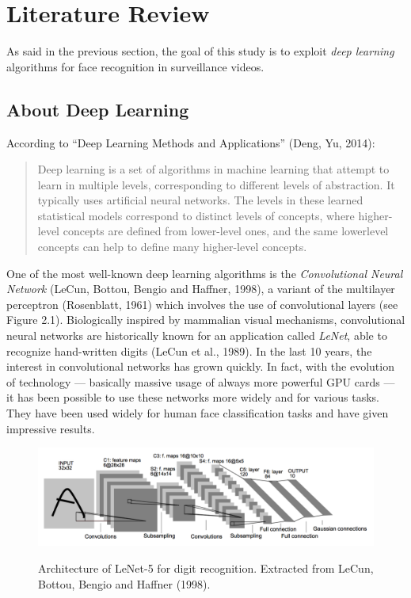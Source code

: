 \setlength{\footskip}{8mm}

\chapter{Literature Review} 
\protect\label{ch:literature-review}

As said in the previous section, the goal of this study is to exploit \textit{deep learning} algorithms for face recognition in surveillance videos.

\section{About Deep Learning}
\protect\label{Main-keywords-of-the-topic}
According to \enquote{Deep Learning Methods and Applications} (Deng, Yu, 2014):

\blockquote{Deep learning is a set of algorithms in machine
learning that attempt to learn in multiple levels, corresponding
to different levels of abstraction. It typically uses artificial
neural networks. The levels in these learned statistical models
correspond to distinct levels of concepts, where higher-level concepts
are defined from lower-level ones, and the same lowerlevel
concepts can help to define many higher-level concepts.}

One of the most well-known deep learning algorithms is the \textit{Convolutional Neural Network} (LeCun, Bottou, Bengio and Haffner, 1998), a variant of the multilayer perceptron (Rosenblatt, 1961) which involves the use of convolutional layers (see Figure 2.1). Biologically inspired by mammalian visual mechanisms, convolutional neural networks are historically known for an application called \textit{LeNet}, able to recognize hand-written digits (LeCun et al., 1989). In the last 10 years, the interest in convolutional networks has grown quickly. In fact, with the evolution of technology --- basically massive usage of always more powerful GPU cards --- it has been possible to use these networks more widely and for various tasks. They have been used widely for human face classification tasks and have given impressive results.

\begin{figure}[!ht]
  \centering
  \includegraphics[scale=0.4]{figures/lenet.png}  
  \caption[Architecture of LeNet-5 for digit recognition. Extracted from LeCun, Bottou, Bengio and Haffner (1998).]{Architecture of LeNet-5 for digit recognition. Extracted from LeCun, Bottou, Bengio and Haffner (1998).}
  \protect\label{fig:lenet}
\end{figure}

